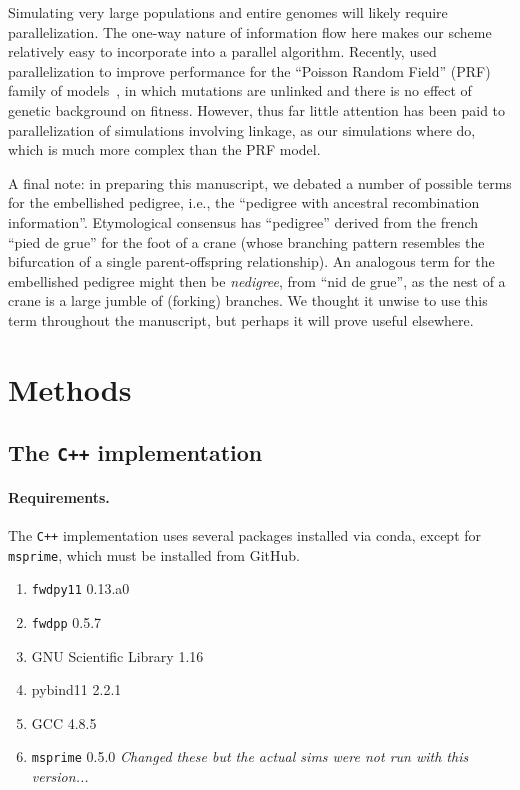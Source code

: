 \documentclass{article}
\newcommand{\fwdpp}{\texttt{fwdpp}}
\newcommand{\fwdpy}{\texttt{fwdpy11}}
\newcommand{\cpp}{\texttt{C++}}
\newcommand{\msprime}{\texttt{msprime}}
\newcommand{\jda}[1]{{\em \color{cyan} #1}}
\begin{document}
Simulating very large populations and entire genomes will likely require parallelization.
The one-way nature of information flow here makes our scheme relatively easy to incorporate
into a parallel algorithm.
Recently, \citet{lawrie2017accelerating} used parallelization
to improve performance for the ``Poisson Random Field'' (PRF) family of models~\citep{Sawyer1992-jw},
in which mutations are unlinked and there is no effect of genetic background on fitness.
However, thus far little attention has been paid to parallelization of simulations involving linkage, as our simulations
where do, which is much more
complex than the PRF model.

A final note:
in preparing this manuscript,
we debated a number of possible terms for the embellished pedigree,
i.e., the ``pedigree with ancestral recombination information''.
Etymological consensus \citep{liberman2014little} has
``pedigree'' derived from the french ``pied de grue'' for the foot of a crane
(whose branching pattern resembles the bifurcation of a single parent-offspring relationship).
An analogous term for the embellished pedigree might then be \emph{nedigree},
from ``nid de grue'',
as the nest of a crane is a large jumble of (forking) branches.
We thought it unwise to use this term throughout the manuscript,
but perhaps it will prove useful elsewhere.


\section*{Methods}

\subsection*{The \cpp{} implementation}

\paragraph{Requirements.}
The \cpp{} implementation uses several packages installed via conda,
except for \msprime{}, which must be installed from GitHub.

\begin{enumerate}
    \item \fwdpy{} 0.13.a0
    \item \fwdpp{} 0.5.7
    \item GNU Scientific Library 1.16
    \item pybind11 2.2.1
    \item GCC 4.8.5
    \item \msprime{} 0.5.0 \jda{Changed these but the actual sims were not run
		    with this version...}
\end{enumerate}
\end{document}
